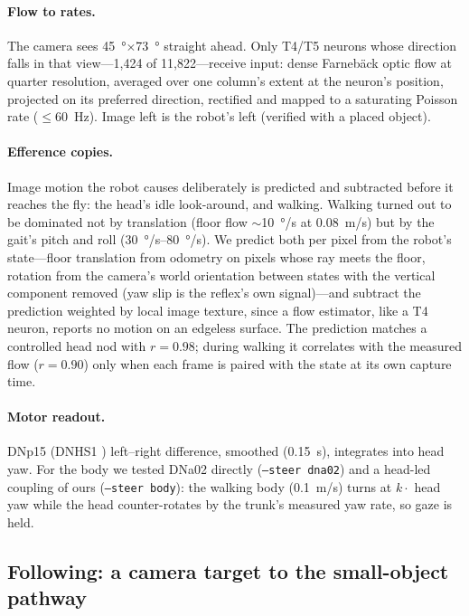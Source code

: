 \documentclass[10pt,a4paper]{article}
\begin{document}
\paragraph{Flow to rates.} The camera sees \SI{45}{\degree}$\times$\SI{73}{\degree} straight ahead.
Only T4/T5 neurons whose direction falls in that view---1{,}424 of 11{,}822---receive input: dense
Farneb\"ack optic flow \cite{farneback2003} at quarter resolution, averaged over one column's extent at the
neuron's position, projected on its preferred direction, rectified and mapped to a saturating Poisson rate
($\le$\SI{60}{Hz}). Image left is the robot's left (verified with a placed object).

\paragraph{Efference copies.} Image motion the robot causes deliberately is predicted and subtracted
before it reaches the fly: the head's idle look-around, and walking. Walking turned out to be dominated not
by translation (floor flow $\sim$\SI{10}{\degree/s} at \SI{0.08}{m/s}) but by the gait's pitch and roll
(\SIrange{30}{80}{\degree/s}). We predict both per pixel from the robot's state---floor translation from
odometry on pixels whose ray meets the floor, rotation from the camera's world orientation between states
with the vertical component removed (yaw slip is the reflex's own signal)---and subtract the prediction
weighted by local image texture, since a flow estimator, like a T4 neuron, reports no motion on an edgeless
surface. The prediction matches a controlled head nod with $r = 0.98$; during walking it correlates with
the measured flow ($r = 0.90$) only when each frame is paired with the state at its own capture time.

\paragraph{Motor readout.} DNp15 (DNHS1 \cite{namiki2018}) left--right difference, smoothed
(\SI{0.15}{s}), integrates into head yaw. For the body we tested DNa02 \cite{rayshubskiy2020} directly
(\texttt{--steer dna02}) and a head-led coupling of ours (\texttt{--steer body}): the walking body
(\SI{0.1}{m/s}) turns at $k \cdot$ head yaw while the head counter-rotates by the trunk's measured yaw
rate, so gaze is held.

\subsection{Following: a camera target to the small-object pathway}
\end{document}
